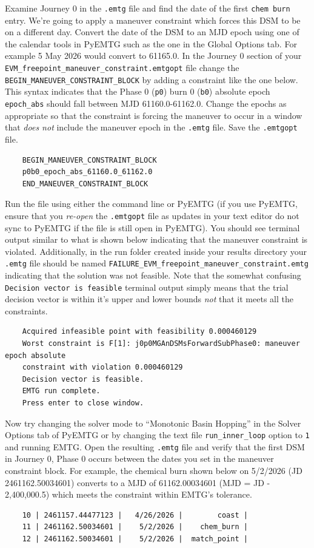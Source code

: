 \documentclass[11pt]{article}
\begin{document}
\noindent Examine Journey 0 in the \verb|.emtg| file and find the date of the first \verb|chem burn| entry. We're going to apply a maneuver constraint which forces this \ac{DSM} to be on a different day. Convert the date of the \ac{DSM} to an \ac{MJD} epoch using one of the calendar tools in PyEMTG such as the one in the Global Options tab. For example 5 May 2026 would convert to 61165.0. In the Journey 0 section of your \verb|EVM_freepoint_maneuver_constraint.emtgopt| file change the \verb|BEGIN_MANEUVER_CONSTRAINT_BLOCK| by adding a constraint like the one below. This syntax indicates that the Phase 0 (\verb|p0|) burn 0 (\verb|b0|) absolute epoch \verb|epoch_abs| should fall between MJD 61160.0-61162.0. Change the epochs as appropriate so that the constraint is forcing the maneuver to occur in a window that \emph{does not} include the maneuver epoch in the \verb|.emtg| file. Save the \verb|.emtgopt| file. 

\begin{verbatim}
    BEGIN_MANEUVER_CONSTRAINT_BLOCK
    p0b0_epoch_abs_61160.0_61162.0
    END_MANEUVER_CONSTRAINT_BLOCK
\end{verbatim}

\noindent Run the file using either the command line or PyEMTG (if you use PyEMTG, ensure that you \emph{re-open} the \verb|.emtgopt| file as updates in your text editor do not sync to PyEMTG if the file is still open in PyEMTG). You should see terminal output similar to what is shown below indicating that the maneuver constraint is violated. Additionally, in the run folder created inside your results directory your \verb|.emtg| file should be named \verb|FAILURE_EVM_freepoint_maneuver_constraint.emtg| indicating that the solution was not feasible. Note that the somewhat confusing \verb|Decision vector is feasible| terminal output simply means that the trial decision vector is within it's upper and lower bounds \emph{not} that it meets all the constraints.


\begin{verbatim}
    Acquired infeasible point with feasibility 0.000460129
    Worst constraint is F[1]: j0p0MGAnDSMsForwardSubPhase0: maneuver epoch absolute 
    constraint with violation 0.000460129
    Decision vector is feasible.
    EMTG run complete.
    Press enter to close window.
\end{verbatim}

\noindent Now try changing the solver mode to ``Monotonic Basin Hopping'' in the Solver Options tab of PyEMTG or by changing the text file \verb|run_inner_loop| option to \verb|1| and running \ac{EMTG}. Open the resulting \verb|.emtg| file and verify that the first \ac{DSM} in Journey 0, Phase 0 occurs between the dates you set in the maneuver constraint block. For example, the chemical burn shown below on 5/2/2026 (\ac{JD} 2461162.50034601) converts to a \ac{MJD} of 61162.00034601 (\ac{MJD} = \ac{JD} - 2,400,000.5) which meets the constraint within \ac{EMTG}'s tolerance. 

\begin{verbatim}
    10 | 2461157.44477123 |   4/26/2026 |        coast | 
    11 | 2461162.50034601 |    5/2/2026 |    chem_burn |
    12 | 2461162.50034601 |    5/2/2026 |  match_point |
\end{verbatim}
\end{document}
